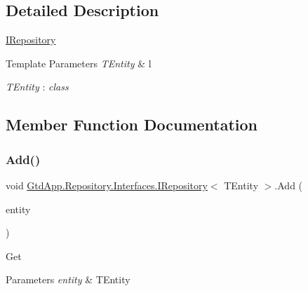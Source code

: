 \subsection{Detailed Description}
\mbox{\hyperlink{interface_gtd_app_1_1_repository_1_1_interfaces_1_1_i_repository}{I\+Repository}} 


\begin{DoxyTemplParams}{Template Parameters}
{\em T\+Entity} & l\\
\hline
\end{DoxyTemplParams}
\begin{Desc}
\item[Type Constraints]\begin{description}
\item[{\em T\+Entity} : {\em class}]\end{description}
\end{Desc}


\subsection{Member Function Documentation}
\mbox{\label{interface_gtd_app_1_1_repository_1_1_interfaces_1_1_i_repository_aa9b2613543ca7471d34aa20f57706604}} 
\subsubsection{\texorpdfstring{Add()}{Add()}}
{\footnotesize\ttfamily void \mbox{\hyperlink{interface_gtd_app_1_1_repository_1_1_interfaces_1_1_i_repository}{Gtd\+App.\+Repository.\+Interfaces.\+I\+Repository}}$<$ T\+Entity $>$.Add (\begin{DoxyParamCaption}\item[{T\+Entity}]{entity }\end{DoxyParamCaption})}



Get 


\begin{DoxyParams}{Parameters}
{\em entity} & T\+Entity\\
\hline
\end{DoxyParams}


